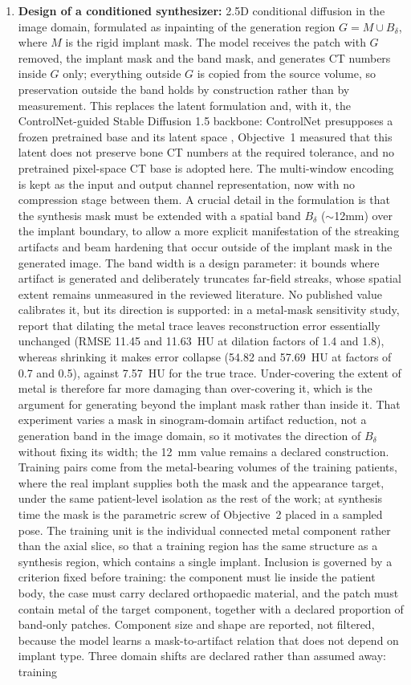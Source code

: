 \documentclass[9pt]{extarticle}
\begin{document}
\begin{enumerate}
  \item \textbf{Design of a conditioned synthesizer:} 2.5D conditional diffusion in the image domain, formulated as inpainting of the generation region $G = M \cup B_{\delta}$, where $M$ is the rigid implant mask. The model receives the patch with $G$ removed, the implant mask and the band mask, and generates CT numbers inside $G$ only; everything outside $G$ is copied from the source volume, so preservation outside the band holds by construction rather than by measurement. This replaces the latent formulation and, with it, the ControlNet-guided Stable Diffusion 1.5 backbone: ControlNet presupposes a frozen pretrained base and its latent space \citep{zhang2023controlnet}, Objective~1 measured that this latent does not preserve bone CT numbers at the required tolerance, and no pretrained pixel-space CT base is adopted here. The multi-window encoding is kept as the input and output channel representation, now with no compression stage between them. A crucial detail in the formulation is that the synthesis mask must be extended with a spatial band $B_{\delta}$ ($\sim$12mm) over the implant boundary, to allow a more explicit manifestation of the streaking artifacts and beam hardening that occur outside of the implant mask in the generated image. The band width is a design parameter: it bounds where artifact is generated and deliberately truncates far-field streaks, whose spatial extent remains unmeasured in the reviewed literature. No published value calibrates it, but its direction is supported: in a metal-mask sensitivity study, \citet{karageorgos2024ddpm} report that dilating the metal trace leaves reconstruction error essentially unchanged (RMSE 11.45 and 11.63~HU at dilation factors of 1.4 and 1.8), whereas shrinking it makes error collapse (54.82 and 57.69~HU at factors of 0.7 and 0.5), against 7.57~HU for the true trace. Under-covering the extent of metal is therefore far more damaging than over-covering it, which is the argument for generating beyond the implant mask rather than inside it. That experiment varies a mask in sinogram-domain artifact reduction, not a generation band in the image domain, so it motivates the direction of $B_{\delta}$ without fixing its width; the 12~mm value remains a declared construction. Training pairs come from the metal-bearing volumes of the training patients, where the real implant supplies both the mask and the appearance target, under the same patient-level isolation as the rest of the work; at synthesis time the mask is the parametric screw of Objective~2 placed in a sampled pose. The training unit is the individual connected metal component rather than the axial slice, so that a training region has the same structure as a synthesis region, which contains a single implant. Inclusion is governed by a criterion fixed before training: the component must lie inside the patient body, the case must carry declared orthopaedic material, and the patch must contain metal of the target component, together with a declared proportion of band-only patches. Component size and shape are reported, not filtered, because the model learns a mask-to-artifact relation that does not depend on implant type. Three domain shifts are declared rather than assumed away: training 
\end{enumerate}
\end{document}
